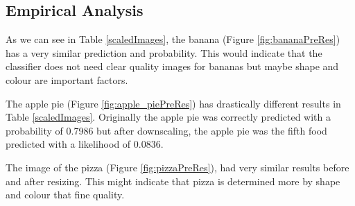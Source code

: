 \subsection*{Empirical Analysis}
As we can see in Table \ref{scaledImages}, the banana (Figure \ref{fig:bananaPreRes}) has a very similar prediction and probability. This would indicate that the classifier does not need clear quality images for bananas but maybe shape and colour are important factors.

The apple pie (Figure \ref{fig:apple_piePreRes}) has drastically different results in Table \ref{scaledImages}. Originally the apple pie was correctly predicted with a probability of 0.7986 but after downscaling, the apple pie was the fifth food predicted with a likelihood of 0.0836.

The image of the pizza (Figure \ref{fig:pizzaPreRes}), had very similar results before and after resizing. This might indicate that pizza is determined more by shape and colour that fine quality.


